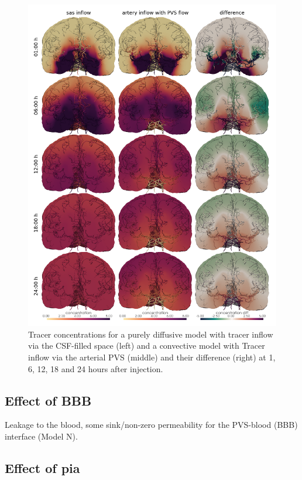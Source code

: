\documentclass[fleqn,10pt]{wlscirep}
\begin{document}
\begin{figure}
    \centering
    \includegraphics[width = 0.9 \textwidth]{modelB_modelC_overview.png}
    \caption{Tracer concentrations for a purely diffusive model with tracer inflow via the CSF-filled space (left) and a convective model with Tracer inflow via the arterial PVS (middle) and their difference (right) at 1, 6, 12, 18 and 24 hours after injection.}
    \label{fig:2}
\end{figure}
\subsection*{Effect of BBB}

Leakage to the blood, some sink/non-zero permeability for the PVS-blood (BBB) interface (Model N).

\begin{figure}
    \caption{}
    \label{fig:3}
\end{figure}

\subsection*{Effect of pia}
  
\end{document}
